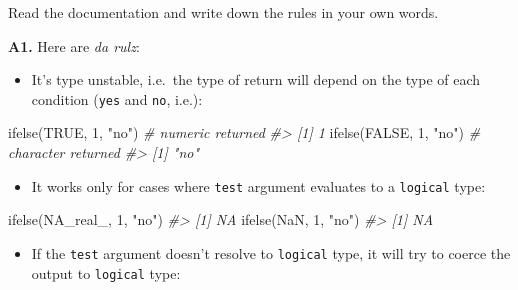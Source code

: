 \documentclass[
]{book}
\newenvironment{Shaded}{\begin{snugshade}}{\end{snugshade}}
\newcommand{\CommentTok}[1]{\textcolor[rgb]{0.56,0.35,0.01}{\textit{#1}}}
\newcommand{\ConstantTok}[1]{\textcolor[rgb]{0.00,0.00,0.00}{#1}}
\newcommand{\DecValTok}[1]{\textcolor[rgb]{0.00,0.00,0.81}{#1}}
\newcommand{\FunctionTok}[1]{\textcolor[rgb]{0.00,0.00,0.00}{#1}}
\newcommand{\NormalTok}[1]{#1}
\newcommand{\StringTok}[1]{\textcolor[rgb]{0.31,0.60,0.02}{#1}}
\providecommand{\tightlist}{%
  \setlength{\itemsep}{0pt}\setlength{\parskip}{0pt}}
\begin{document}
Read the documentation and write down the rules in your own words.

\textbf{A1.} Here are \emph{da rulz}:

\begin{itemize}
\tightlist
\item
  It's type unstable, i.e.~the type of return will depend on the type of each condition (\texttt{yes} and \texttt{no}, i.e.):
\end{itemize}

\begin{Shaded}
\begin{Highlighting}[]
\FunctionTok{ifelse}\NormalTok{(}\ConstantTok{TRUE}\NormalTok{, }\DecValTok{1}\NormalTok{, }\StringTok{"no"}\NormalTok{) }\CommentTok{\# \textasciigrave{}numeric\textasciigrave{} returned}
\CommentTok{\#\textgreater{} [1] 1}
\FunctionTok{ifelse}\NormalTok{(}\ConstantTok{FALSE}\NormalTok{, }\DecValTok{1}\NormalTok{, }\StringTok{"no"}\NormalTok{) }\CommentTok{\# \textasciigrave{}character\textasciigrave{} returned}
\CommentTok{\#\textgreater{} [1] "no"}
\end{Highlighting}
\end{Shaded}

\begin{itemize}
\tightlist
\item
  It works only for cases where \texttt{test} argument evaluates to a \texttt{logical} type:
\end{itemize}

\begin{Shaded}
\begin{Highlighting}[]
\FunctionTok{ifelse}\NormalTok{(}\ConstantTok{NA\_real\_}\NormalTok{, }\DecValTok{1}\NormalTok{, }\StringTok{"no"}\NormalTok{)}
\CommentTok{\#\textgreater{} [1] NA}
\FunctionTok{ifelse}\NormalTok{(}\ConstantTok{NaN}\NormalTok{, }\DecValTok{1}\NormalTok{, }\StringTok{"no"}\NormalTok{)}
\CommentTok{\#\textgreater{} [1] NA}
\end{Highlighting}
\end{Shaded}

\begin{itemize}
\tightlist
\item
  If the \texttt{test} argument doesn't resolve to \texttt{logical} type, it will try to coerce the output to \texttt{logical} type:
\end{itemize}
\end{document}
